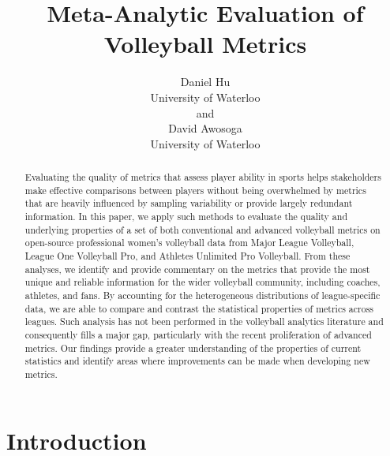 \documentclass[
  12pt]{article}
\begin{document}
\def\spacingset#1{\renewcommand{\baselinestretch}%
{#1}\small\normalsize} \spacingset{1}



\title{\bf Meta-Analytic Evaluation of Volleyball Metrics}
\author{
Daniel Hu\\
University of Waterloo\\
and\\David Awosoga\\
University of Waterloo\\
}
\maketitle

\bigskip
\bigskip
\begin{abstract}
Evaluating the quality of metrics that assess player ability in sports
helps stakeholders make effective comparisons between players without
being overwhelmed by metrics that are heavily influenced by sampling
variability or provide largely redundant information. In this paper, we
apply such methods to evaluate the quality and underlying properties of
a set of both conventional and advanced volleyball metrics on
open-source professional women's volleyball data from Major League
Volleyball, League One Volleyball Pro, and Athletes Unlimited Pro
Volleyball. From these analyses, we identify and provide commentary on
the metrics that provide the most unique and reliable information for
the wider volleyball community, including coaches, athletes, and fans.
By accounting for the heterogeneous distributions of league-specific
data, we are able to compare and contrast the statistical properties of
metrics across leagues. Such analysis has not been performed in the
volleyball analytics literature and consequently fills a major gap,
particularly with the recent proliferation of advanced metrics. Our
findings provide a greater understanding of the properties of current
statistics and identify areas where improvements can be made when
developing new metrics.
\end{abstract}


\newpage
\spacingset{1.9} %


\section{Introduction}\label{introduction}
\end{document}
